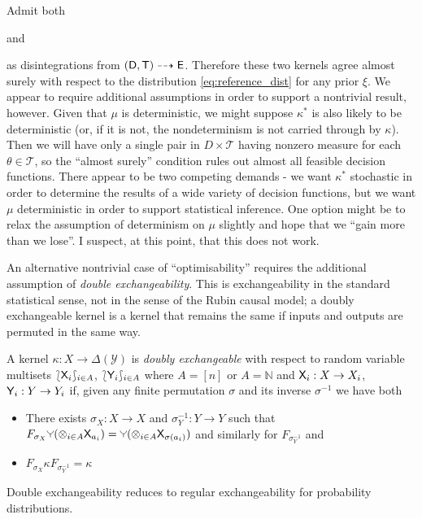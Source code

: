 Admit both  and  as disintegrations from $(\mathsf{D},\mathsf{T})\dashrightarrow\mathsf{E}$. Therefore these two kernels agree almost surely with respect to the distribution \ref{eq:reference_dist} for any prior $\xi$. We appear to require additional assumptions in order to support a nontrivial result, however. Given that $\mu$ is deterministic, we might suppose $\kappa^*$ is also likely to be deterministic (or, if it is not, the nondeterminism is not carried through by $\kappa$). Then we will have only a single pair in $D\times \mathscr{T}$ having nonzero measure for each $\theta \in \mathscr{T}$, so the ``almost surely'' condition rules out almost all feasible decision functions. There appear to be two competing demands - we want $\kappa^*$ stochastic in order to determine the results of a wide variety of decision functions, but we want $\mu$ deterministic in order to support statistical inference. One option might be to relax the assumption of determinism on $\mu$ slightly and hope that we ``gain more than we lose''. I suspect, at this point, that this does not work.

An alternative nontrivial case of ``optimisability'' requires the additional assumption of \emph{double exchangeability}. This is exchangeability in the standard statistical sense, not in the sense of the Rubin causal model; a doubly exchangeable kernel is a kernel that remains the same if inputs and outputs are permuted in the same way.

\begin{definition}
A kernel $\kappa:X\to \Delta(\mathcal{Y})$ is \emph{doubly exchangeable} with respect to random variable multisets $\lbag\mathsf{X}_i\rbag_{i\in A}$, $\lbag\mathsf{Y}_i\rbag_{i\in A}$ where $A=[n]$ or $A=\mathbb{N}$ and $\mathsf{X}_i:X\to X_i$, $\mathsf{Y}_i:Y\to Y_i$ if, given any finite permutation $\sigma$ and its inverse $\sigma^{-1}$ we have both
\begin{itemize}
	\item There exists $\sigma_X:X\to X$ and $\sigma^{-1}_Y:Y\to Y$ such that $F_{\sigma_X}\splitter{0.1}(\otimes_{i\in A} \RV{X}_{a_i}) = \splitter{0.1}(\otimes_{i\in A} \RV{X}_{\sigma(a_i)})$ and similarly for $F_{\sigma^{-1}_Y}$ and
	\item $F_{\sigma_X}\kappa F_{\sigma^{-1}_Y} = \kappa$
\end{itemize}

Double exchangeability reduces to regular exchangeability for probability distributions.
\end{definition}

